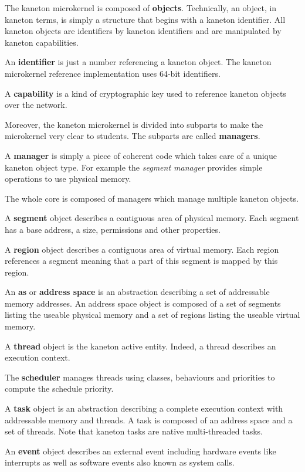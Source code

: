 The kaneton microkernel is composed of \textbf{objects}. Technically,
an object, in kaneton terms, is simply a structure that begins with
a kaneton identifier. All kaneton objects are identifiers by kaneton
identifiers and are manipulated by kaneton capabilities.

An \textbf{identifier} is just a number referencing a kaneton object.
The kaneton microkernel reference implementation uses 64-bit identifiers.

A \textbf{capability} is a kind of cryptographic key used to reference
kaneton objects over the network.

Moreover, the kaneton microkernel is divided into subparts to make the
microkernel very clear to students. The subparts are called \textbf{managers}.

A \textbf{manager} is simply a piece of coherent code which takes care
of a unique kaneton object type. For example the \textit{segment manager}
provides simple operations to use physical memory.

The whole core is composed of managers which manage multiple kaneton objects.

A \textbf{segment} object describes a contiguous area of physical memory.
Each segment has a base address, a size, permissions and other properties.

A \textbf{region} object describes a contiguous area of virtual memory.
Each region references a segment meaning that a part of this segment
is mapped by this region.

An \textbf{as} or \textbf{address space} is an abstraction describing
a set of addressable memory addresses. An address space object is composed
of a set of segments listing the useable physical memory and a set of
regions listing the useable virtual memory.

A \textbf{thread} object is the kaneton active entity. Indeed, a thread
describes an execution context.

The \textbf{scheduler} manages threads using classes, behaviours and
priorities to compute the schedule priority.

A \textbf{task} object is an abstraction describing a complete execution
context with addressable memory and threads. A task is composed of
an address space and a set of threads. Note that kaneton tasks are
native multi-threaded tasks.

An \textbf{event} object describes an external event including hardware
events like interrupts as well as software events also known as system
calls.

